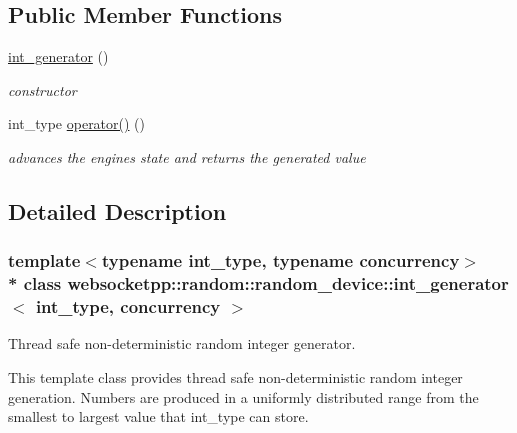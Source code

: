 \subsection*{Public Member Functions}
\begin{DoxyCompactItemize}
\item 
\hyperlink{classwebsocketpp_1_1random_1_1random__device_1_1int__generator_ac1752f1f3cb1c3cb6a98e252b6baac8a}{int\+\_\+generator} ()\hypertarget{classwebsocketpp_1_1random_1_1random__device_1_1int__generator_ac1752f1f3cb1c3cb6a98e252b6baac8a}{}\label{classwebsocketpp_1_1random_1_1random__device_1_1int__generator_ac1752f1f3cb1c3cb6a98e252b6baac8a}

\begin{DoxyCompactList}\small\item\em constructor \end{DoxyCompactList}\item 
int\+\_\+type \hyperlink{classwebsocketpp_1_1random_1_1random__device_1_1int__generator_a6e4fea3c83b876cc364f9d9370b0c5a1}{operator()} ()\hypertarget{classwebsocketpp_1_1random_1_1random__device_1_1int__generator_a6e4fea3c83b876cc364f9d9370b0c5a1}{}\label{classwebsocketpp_1_1random_1_1random__device_1_1int__generator_a6e4fea3c83b876cc364f9d9370b0c5a1}

\begin{DoxyCompactList}\small\item\em advances the engine\textquotesingle{}s state and returns the generated value \end{DoxyCompactList}\end{DoxyCompactItemize}


\subsection{Detailed Description}
\subsubsection*{template$<$typename int\+\_\+type, typename concurrency$>$\\*
class websocketpp\+::random\+::random\+\_\+device\+::int\+\_\+generator$<$ int\+\_\+type, concurrency $>$}

Thread safe non-\/deterministic random integer generator. 

This template class provides thread safe non-\/deterministic random integer generation. Numbers are produced in a uniformly distributed range from the smallest to largest value that int\+\_\+type can store.

